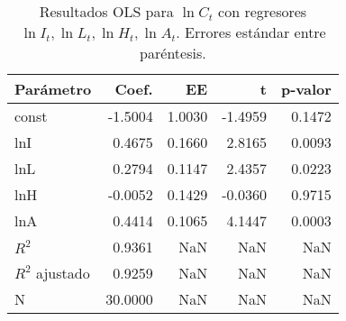 \begin{table}
\caption{Resultados OLS para $\ln C_t$ con regresores $\ln I_t, \ln L_t, \ln H_t, \ln A_t$. Errores estándar entre paréntesis.}
\label{tab:q7_a}
\begin{tabular}{lrrrr}
\toprule
Parámetro & Coef. & EE & t & p-valor \\
\midrule
const & -1.5004 & 1.0030 & -1.4959 & 0.1472 \\
lnI & 0.4675 & 0.1660 & 2.8165 & 0.0093 \\
lnL & 0.2794 & 0.1147 & 2.4357 & 0.0223 \\
lnH & -0.0052 & 0.1429 & -0.0360 & 0.9715 \\
lnA & 0.4414 & 0.1065 & 4.1447 & 0.0003 \\
$R^2$ & 0.9361 & NaN & NaN & NaN \\
$R^2$ ajustado & 0.9259 & NaN & NaN & NaN \\
N & 30.0000 & NaN & NaN & NaN \\
\bottomrule
\end{tabular}
\end{table}
